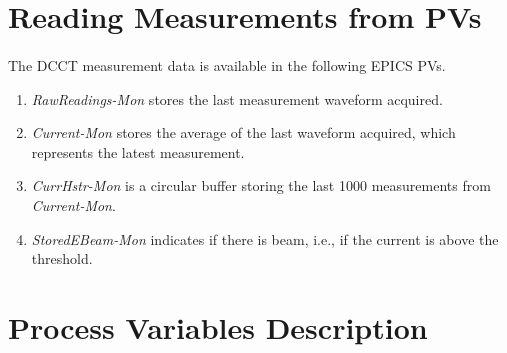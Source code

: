 \documentclass[openany]{article}
\begin{document}
\section{Reading Measurements from PVs}

	\paragraph{} The DCCT measurement data is available in the following EPICS PVs.

		\begin{enumerate}
			\item \emph{RawReadings-Mon} stores the last measurement waveform acquired.
			\item \emph{Current-Mon} stores the average of the last waveform acquired, which represents the latest measurement.
			\item \emph{CurrHstr-Mon} is a circular buffer storing the last 1000 measurements from \emph{Current-Mon}.
			\item \emph{StoredEBeam-Mon} indicates if there is beam, i.e., if the current is above the threshold.
		\end{enumerate}

\newpage
\section{Process Variables Description}\label{sec:process-variables}
\end{document}
